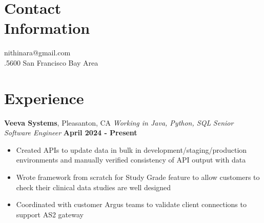 \documentclass[margin,line]{resume}
\begin{document}

\begin{resume}

\section{\mysidestyle Contact\\Information}

nithinara@gmail.com \\
.5600 \hfill
San Francisco Bay Area

\section{\mysidestyle Experience}

\textbf{Veeva Systems}, Pleasanton, CA \vspace{2mm} \newline
\textsl{Working in Java, Python, SQL} \vspace{2mm} \newline
\textsl{Senior Software Engineer} \hfill \textbf{April 2024 - Present} \vspace{2mm}
\begin{itemize} 
    \item Created APIs to update data in bulk in development/staging/production environments and manually verified consistency of API output with data
    \item Wrote framework from scratch for Study Grade feature to allow customers to check their clinical data studies are well designed
    \item Coordinated with customer Argus teams to validate client connections to support AS2 gateway
\end{itemize}


\end{resume}
\end{document}
